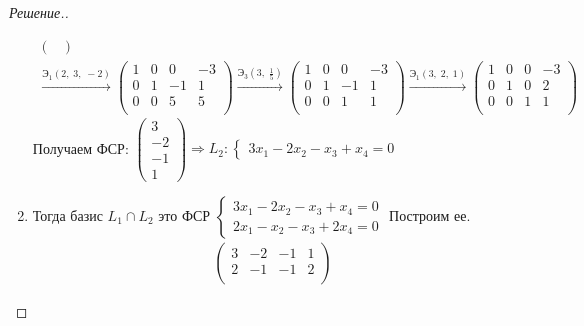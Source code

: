 \documentclass[a4paper]{article}
\theoremstyle{remark}
\newcommand{\eq}[1]{\begin{cases} #1 \end{cases}}
\newcommand{\arron}[3]{%
  \ensuremath{\xrightarrow{\text{Э}_1(#1,\; #2,\; #3)}}%
}
\newcommand{\arrth}[2]{%
  \ensuremath{\xrightarrow{\text{Э}_3(#1,\; #2)}}%
}
\begin{document}
\begin{proof}[Решение.]
\begin{enumerate}
\begin{multline*}
\begin{pmatrix}
                    \end{pmatrix} \\
                    \arron{2}{3}{-2}
                    \begin{pmatrix}
                        1 & 0 & 0 & -3 \\
                        0 & 1 & -1 & 1 \\
                        0 & 0 & 5 & 5 \\
                    \end{pmatrix}
                    \arrth{3}{\frac15}
                    \begin{pmatrix}
                        1 & 0 & 0 & -3 \\
                        0 & 1 & -1 & 1 \\
                        0 & 0 & 1 & 1 \\
                    \end{pmatrix}
                    \arron{3}{2}{1}
                    \begin{pmatrix}
                        1 & 0 & 0 & -3 \\
                        0 & 1 & 0 & 2 \\
                        0 & 0 & 1 & 1 \\
                    \end{pmatrix}
                \end{multline*}
                Получаем ФСР: $
                \begin{pmatrix}
                    3\\
                    -2\\
                    -1\\
                    1
                \end{pmatrix}
                \Rightarrow L_2 \colon \eq{3x_1 - 2x_2 - x_3 + x_4 = 0}$
                \item Тогда базис $L_1 \cap L_2$ это ФСР 
                $\eq{
                    3x_1 - 2x_2 - x_3 + x_4 = 0 \\
                    2x_1 - x_2 - x_3 + 2x_4 = 0
                }$
                Построим ее. 
                \begin{multline*}
                    \begin{pmatrix}
                        3 & -2 & -1 & 1 \\
                        2 & -1 & -1 & 2 \\
                    \end{pmatrix} 

\end{multline*}
\end{enumerate}
\end{proof}
\end{document}

